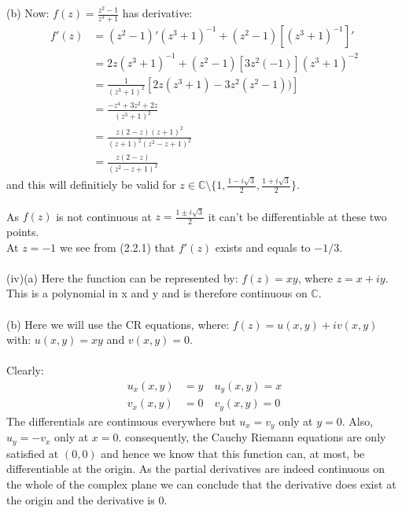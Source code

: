 \documentclass[12pt,a4paper]{article}
\begin{document}
\newpage
\noindent
(b) Now: $f(z) = \frac{z^2-1}{z^3+1}$ has derivative:
\begin{align*}
    f'(z) &= (z^2-1)' (z^3+1)^{-1} + (z^2-1)[(z^3+1)^{-1}]' \\
    &= 2z(z^3+1)^{-1} + (z^2-1)[3z^2 (-1)](z^3+1)^{-2} \\
    &= \frac{1}{(z^3+1)^2} \left[2z(z^3+1) - 3z^2(z^2-1)) \right] \\
    &= \frac{-z^4+3z^2+2z}{(z^3+1)^2} \\
    &= \frac{z(2-z)(z+1)^2}{(z+1)^2(z^2-z+1)^2} \\
    &= \frac{z(2-z)}{(z^2-z+1)^2} \tag{2.2.1}
\end{align*}
and this will definitiely be valid for $z \in \mathbb{C} \setminus \{1, \frac{1 - i \sqrt{3}}{2}, \frac{1 + i \sqrt{3}}{2}\}$.\\
\\
As $f(z)$ is not continuous at $z=\frac{1 \pm i \sqrt{3}}{2}$ it can't be differentiable at these two points.\\
At $z=-1$ we see from (2.2.1) that $f'(z)$ exists and equals to $-1/3$.\\
\\
(iv)(a) Here the function can be represented by: $f(z)=xy$, where $z=x+iy$.\\
This is a polynomial in x and y and is therefore continuous on $\mathbb{C}$.\\
\\
(b) Here we will use the CR equations, where: $f(z) = u(x,y)+ iv(x,y)$ with: $u(x,y)=xy$ and $v(x,y)=0$.\\
\\
Clearly:
\begin{align*}
    u_x(x,y) &= y \quad u_y(x,y) = x \\
    v_x(x,y) &= 0 \quad v_y(x,y) = 0
\end{align*}
The differentials are continuous everywhere but $u_x = v_y$ only at $y=0$.  Also, $u_y = -v_x$ only at $x=0$.
consequently, the Cauchy Riemann equations are only satisfied at $(0,0)$ and hence we know that this function can, at most, be
differentiable at the origin.  As the partial derivatives are indeed continuous on the whole of the complex plane we can
conclude that the derivative does exist at the origin and the derivative is 0.


\newpage
\end{document}
